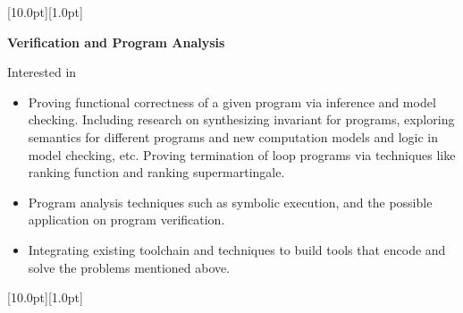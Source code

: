 \documentclass[12pt,a4paper,utf8]{report}
\begin{document}
\begin{minipage}[t]{16cm}
    \colorbox{subtitlecolor}{\raisebox{0pt}[10.0pt][1.0pt]{
        \textcolor{white}{\textsf{}}}}
\end{minipage}\par
\vspace{0.2cm}\hspace{0.5cm}
    \begin{minipage}[t]{15.0cm}
        \textbf{Verification and Program Analysis}\par
        Interested in
        \begin{itemize}
        \item Proving functional correctness of a given program via inference and model checking. Including research on synthesizing invariant for programs, exploring semantics for different programs and new computation models and logic in model checking, etc. 
        Proving termination of loop programs via techniques like ranking function and ranking supermartingale.
        \item Program analysis techniques such as symbolic execution, and the possible application on program verification.
        \item Integrating existing toolchain and techniques to build tools that encode and solve the problems mentioned above.
		\end{itemize}       
    \end{minipage}\par
\vspace{0.4cm}

\begin{minipage}[t]{16cm}
    \colorbox{subtitlecolor}{\raisebox{0pt}[10.0pt][1.0pt]{
        \textcolor{white}{\textsf{}}}}
\end{minipage}\par
\end{document}
